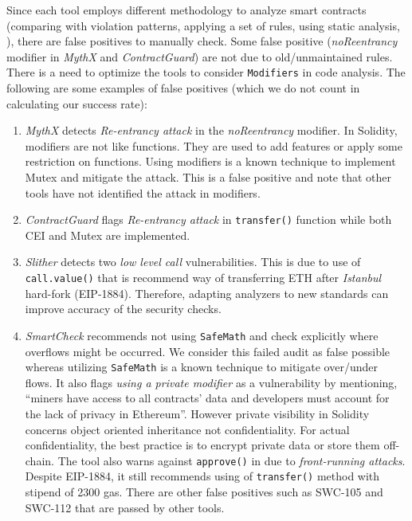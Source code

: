 Since each tool employs different methodology to analyze smart contracts (\eg comparing with violation patterns, applying a set of rules, using static analysis, \etc), there are false positives to manually check. {\blue Some false positive (\eg \textit{noReentrancy} modifier in \textit{MythX} and \textit{ContractGuard}) are not due to old/unmaintained rules. There is a need to optimize the tools to consider \texttt{Modifiers} in code analysis.}  The following are some examples of false positives (which we do not count in calculating our success rate):
\begin{enumerate}[noitemsep,topsep=0pt]
	\item \textit{MythX} detects \textit{Re-entrancy attack} in the \textit{noReentrancy} modifier. In Solidity, modifiers are not like functions. They are used to add features or apply some restriction on functions\cite{SolidityModifer}. Using modifiers is a known technique to implement Mutex and mitigate the attack\cite{ReentrancyGuard}. This is a false positive and note that other tools have not identified the attack in modifiers.

	\item \textit{ContractGuard} flags \textit{Re-entrancy attack} in \texttt{transfer()} function while both CEI and Mutex are implemented.

	\item \textit{Slither} detects two \textit{low level call} vulnerabilities\cite{SlitherSetup}. This is due to use of \texttt{call.value()} that is recommend way of transferring ETH after \textit{Istanbul} hard-fork (EIP-1884).	Therefore, adapting analyzers to new standards can improve accuracy of the security checks.

	\item \textit{SmartCheck} recommends not using \texttt{SafeMath} and check explicitly where overflows might be occurred. We consider this failed audit as false possible whereas utilizing \texttt{SafeMath} is a known technique to mitigate over/under flows. It also flags \textit{using a private modifier} as a vulnerability by mentioning, ``miners have access to all contracts' data and developers must account for the lack of privacy in Ethereum''. However private visibility in Solidity concerns object oriented inheritance not confidentiality. For actual confidentiality, the best practice is to encrypt private data or store them off-chain. The tool also warns against \texttt{approve()} in \erc due to \textit{front-running attacks}. Despite EIP-1884, it still recommends using of \texttt{transfer()} method with stipend of 2300 gas. There are other false positives such as SWC-105 and SWC-112 that are passed by other tools.


\end{enumerate}
